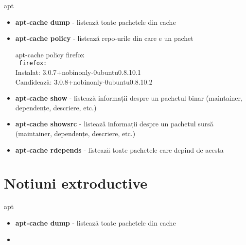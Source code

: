 \documentclass{beamer}
\begin{document}
\begin{frame}{apt}
  \begin{itemize}
  \item \textbf{apt-cache dump} - listează toate pachetele din cache
  \item \textbf{apt-cache policy} - listează repo-urile din care e un pachet
    \begin{beamerboxesrounded}[lower=block body,shadow=true,width=8cm]{}
      apt-cache policy firefox \\
      \texttt{   firefox:}\\
      Instalat: 3.0.7+nobinonly-0ubuntu0.8.10.1 \\
      Candidează: 3.0.8+nobinonly-0ubuntu0.8.10.2
    \end{beamerboxesrounded}
  \item \textbf{apt-cache show} - listează informații despre un pachetul binar (maintainer, dependențe, descriere, etc.)
  \item \textbf{apt-cache showsrc} - listează informații despre un pachetul sursă (maintainer, dependențe, descriere, etc.)
  \item \textbf{apt-cache rdepends} - listează toate pachetele care depind de acesta
  \end{itemize}
\end{frame}


\section{Notiuni extroductive}
\frame{\tableofcontents[currentsection]}

\begin{frame}{apt}
  \begin{itemize}
  \item \textbf{apt-cache dump} - listează toate pachetele din cache
    \item 
  \end{itemize}
\end{frame}
\end{document}
